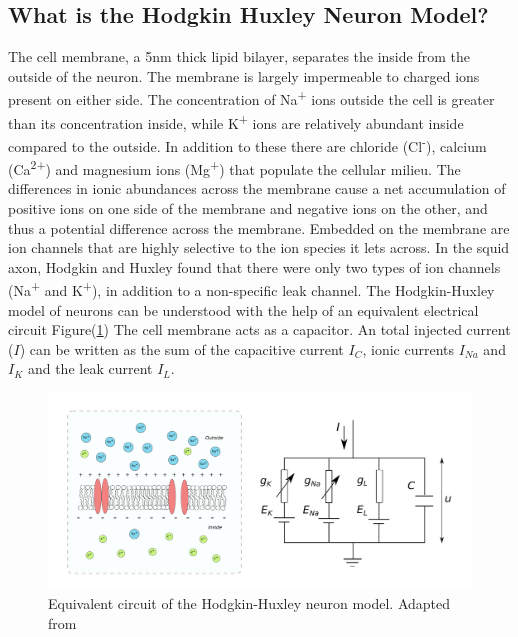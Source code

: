 \documentclass[10pt,letterpaper]{article}
\begin{document}
\begin{nolinenumbers}
\subsection*{What is the Hodgkin Huxley Neuron Model?}
The cell membrane, a 5nm thick lipid bilayer, separates the inside from the outside of the neuron. The membrane is largely impermeable to charged ions present on either side. The concentration of Na\textsuperscript{+} ions outside the cell is greater than its concentration inside, while K\textsuperscript{+} ions are relatively abundant inside compared to the outside. In addition to these there are chloride (Cl\textsuperscript{-}), calcium (Ca\textsuperscript{2+}) and magnesium ions (Mg\textsuperscript{+}) that populate the cellular milieu. The differences in ionic abundances across the membrane cause a net accumulation of positive ions on one side of the membrane and negative ions on the other, and thus a potential difference across the membrane. Embedded on the membrane are ion channels that are highly selective to the ion species it lets across. In the squid axon, Hodgkin and Huxley found that there were only two types of ion channels (Na\textsuperscript{+} and K\textsuperscript{+}), in addition to a non-specific leak channel. The Hodgkin-Huxley model of neurons can be understood with the help of an equivalent electrical circuit Figure(\ref{fig:HH}) The cell membrane acts as a capacitor. An total injected current ($I$) can be written as the sum of the capacitive current $I_{C}$, ionic currents $I_{Na}$ and $I_{K}$ and the leak current $I_L$.

\begin{figure}[H]
\begin{center}
\includegraphics[scale=0.4]{Figures/fig7.pdf} 
\caption{Equivalent circuit of the Hodgkin-Huxley neuron model. Adapted from~\cite{Gerstner2014}}
\label{fig:HH}
\end{center}
\end{figure}


\end{nolinenumbers}
\end{document}
